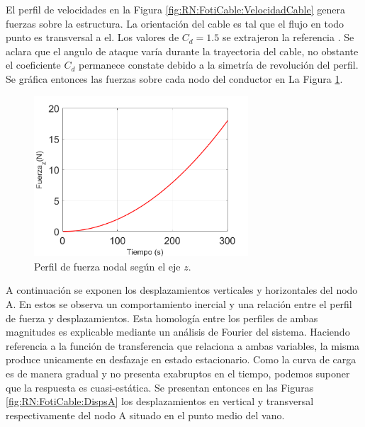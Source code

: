 El perfil de velocidades en la Figura \ref{fig:RN:FotiCable:VelocidadCable} genera fuerzas sobre la estructura. La orientación del cable es tal que el flujo en todo punto es transversal a el. Los valores de $C_d=1.5$ se extrajeron la referencia \citep{foti2018finite}. Se aclara que el angulo de ataque varía durante la trayectoria del cable, no obstante el coeficiente $C_d$ permanece constate debido a la simetría de revolución del perfil. Se gráfica entonces las fuerzas sobre cada nodo del conductor en La Figura \ref{fig:RN:FotiCable:FuerzaZ}.


\begin{figure}[h]
\centering
\includegraphics[width=80mm]{./imagenes/ResultadosNumericos/SimpleCable/FuerzaNodalZ_TLFoti.png}
\caption{Perfil de fuerza nodal según el eje $z$.}
\label{fig:RN:FotiCable:FuerzaZ}
\end{figure}


A continuación se exponen los desplazamientos verticales y horizontales del nodo $\text{A}$. En estos se observa un comportamiento inercial y una relación entre el perfil de fuerza y desplazamientos. Esta homología entre los perfiles de ambas magnitudes es explicable mediante un análisis de Fourier del sistema. Haciendo referencia a la función de transferencia que relaciona a ambas variables, la misma produce unicamente en desfazaje en estado estacionario. Como la curva de carga es de manera gradual y no presenta exabruptos en el tiempo, podemos suponer que la respuesta es cuasi-estática. Se presentan entonces en las Figuras \ref{fig:RN:FotiCable:DispsA} los desplazamientos en vertical y transversal respectivamente del nodo A situado en el punto medio del vano. 



